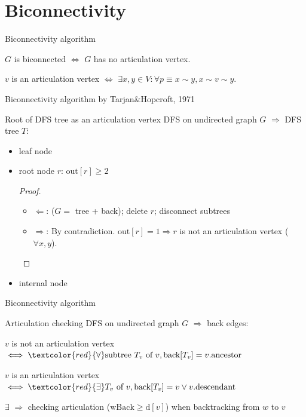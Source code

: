 \section{Biconnectivity}

\begin{frame}{Biconnectivity algorithm}
  \begin{center}
    $G$ is biconnected $\iff$ $G$ has no articulation vertex.

    $v$ is an articulation vertex $\iff$ $\exists x,y \in V: \forall p \equiv x \sim y, x \sim v \sim y$.

    Biconnectivity algorithm by Tarjan\&Hopcroft, 1971
  \end{center}

  \begin{exampleblock}{Root of DFS tree as an articulation vertex }
    DFS on undirected graph $G$ $\Rightarrow$ DFS tree $T$:
    \begin{itemize}
      \item leaf node
      \item root node $r$: $\text{out}[r] \ge 2$
	\begin{proof}
	  \begin{itemize}
	    \item $\Leftarrow$: ($G = $ tree + back); delete $r$; disconnect subtrees
	    \item $\Rightarrow$: By contradiction. $\text{out}[r] = 1 \Rightarrow r$ is not an articulation vertex ($\forall x,y$).
	  \end{itemize}
	\end{proof}
      \item internal node
    \end{itemize}
  \end{exampleblock}
\end{frame}
\begin{frame}{Biconnectivity algorithm}
  \begin{exampleblock}{Articulation checking }
    DFS on undirected graph $G$ $\Rightarrow$ back edges:
    \begin{center}
      $v$ is not an articulation vertex $\iff \textcolor{red}{\forall} \text{subtree } T_{v} \text{ of } v, \text{back}[T_{v}] = v.\text{ancestor}$

      $v$ is an articulation vertex $\iff \textcolor{red}{\exists} T_{v} \text{ of } v, \text{back}[T_{v}] = v \lor v.\text{descendant}$
    \end{center}

    $\exists$ $\Rightarrow$ checking articulation ($\text{wBack} \ge \text{d}[v]$) when backtracking from $w$ to $v$
  \end{exampleblock}
\end{frame}
